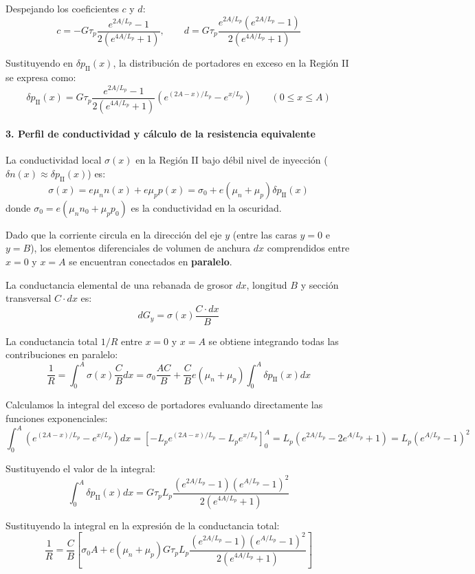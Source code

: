 \begin{problema}
Despejando los coeficientes $c$ y $d$:
\[
c = -G \tau_p \frac{e^{2A/L_p} - 1}{2 \left(e^{4A/L_p} + 1\right)}, \qquad d = G \tau_p \frac{e^{2A/L_p}\left(e^{2A/L_p} - 1\right)}{2 \left(e^{4A/L_p} + 1\right)}
\]

Sustituyendo en $\delta p_{\text{II}}(x)$, la distribución de portadores en exceso en la Región II se expresa como:
\[
\delta p_{\text{II}}(x) = G \tau_p \frac{e^{2A/L_p} - 1}{2 \left(e^{4A/L_p} + 1\right)} \left( e^{(2A-x)/L_p} - e^{x/L_p} \right) \qquad (0 \le x \le A)
\]

\paragraph{3. Perfil de conductividad y cálculo de la resistencia equivalente}
La conductividad local $\sigma(x)$ en la Región II bajo débil nivel de inyección ($\delta n(x) \approx \delta p_{\text{II}}(x)$) es:
\[
\sigma(x) = e \mu_n n(x) + e \mu_p p(x) = \sigma_0 + e (\mu_n + \mu_p) \delta p_{\text{II}}(x)
\]
donde $\sigma_0 = e (\mu_n n_0 + \mu_p p_0)$ es la conductividad en la oscuridad.

Dado que la corriente circula en la dirección del eje $y$ (entre las caras $y = 0$ e $y = B$), los elementos diferenciales de volumen de anchura $dx$ comprendidos entre $x = 0$ y $x = A$ se encuentran conectados en \textbf{paralelo}.

La conductancia elemental de una rebanada de grosor $dx$, longitud $B$ y sección transversal $C \cdot dx$ es:
\[
dG_y = \sigma(x) \frac{C \cdot dx}{B}
\]

La conductancia total $1/R$ entre $x = 0$ y $x = A$ se obtiene integrando todas las contribuciones en paralelo:
\[
\frac{1}{R} = \int_0^A \sigma(x) \frac{C}{B} dx = \sigma_0 \frac{A C}{B} + \frac{C}{B} e (\mu_n + \mu_p) \int_0^A \delta p_{\text{II}}(x) dx
\]

Calculamos la integral del exceso de portadores evaluando directamente las funciones exponenciales:
\[
\int_0^A \left( e^{(2A-x)/L_p} - e^{x/L_p} \right) dx = \left[ -L_p e^{(2A-x)/L_p} - L_p e^{x/L_p} \right]_0^A = L_p \left( e^{2A/L_p} - 2 e^{A/L_p} + 1 \right) = L_p \left( e^{A/L_p} - 1 \right)^2
\]

Sustituyendo el valor de la integral:
\[
\int_0^A \delta p_{\text{II}}(x) dx = G \tau_p L_p \frac{\left(e^{2A/L_p} - 1\right)\left(e^{A/L_p} - 1\right)^2}{2 \left(e^{4A/L_p} + 1\right)}
\]

Sustituyendo la integral en la expresión de la conductancia total:
\[
\frac{1}{R} = \frac{C}{B} \left[ \sigma_0 A + e (\mu_n + \mu_p) G \tau_p L_p \frac{\left(e^{2A/L_p} - 1\right)\left(e^{A/L_p} - 1\right)^2}{2 \left(e^{4A/L_p} + 1\right)} \right]
\]


\end{problema}
